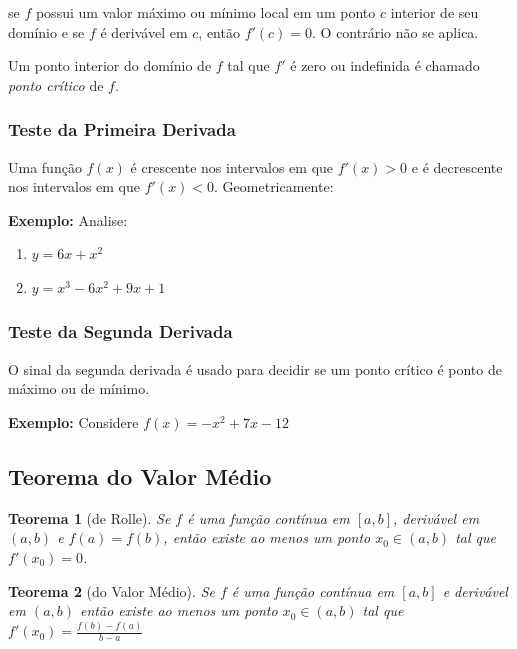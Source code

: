 \documentclass[oneside,a4paper,12pt]{article}
\newtheorem{theorem}{Teorema}[section]
\begin{document}
se $f$ possui um valor máximo ou mínimo local em um ponto $c$ interior de seu domínio e se $f$ é derivável em $c$, então $f'(c) = 0$. O contrário não se aplica.

Um ponto interior do domínio de $f$ tal que $f'$ é zero ou indefinida é chamado \emph{ponto crítico} de $f$.

\subsubsection{Teste da Primeira Derivada}

Uma função $f(x)$ é crescente nos intervalos em que $f'(x) > 0$ e é decrescente nos intervalos em que $f'(x) < 0$.
Geometricamente:

\vspace{200pt}

{\bf Exemplo: } Analise:
\begin{enumerate}
	\item $y = 6x + x^2$
	\vspace{250pt}
	\item $y = x^3 - 6x^2 + 9x + 1$
	\vspace{300pt}
\end{enumerate}
\newpage

\subsubsection{Teste da Segunda Derivada}

O sinal da segunda derivada é usado para decidir se um ponto crítico é ponto de máximo ou de mínimo.

\vspace{200pt}

{\bf Exemplo:} Considere $f(x) = -x^2 + 7x - 12$

\vspace{300pt}

\subsection{Teorema do Valor Médio}
\begin{theorem}[de Rolle]
	Se $f$ é uma função contínua em $[a,b]$, derivável em $(a,b)$ e $f(a) = f(b)$, então existe ao menos um ponto $x_0 \in (a,b)$ tal que $f'(x_0) = 0$.
\end{theorem}

\vspace{200pt}

\begin{theorem}[do Valor Médio]
	Se $f$ é uma função contínua em $[a,b]$ e derivável em $(a,b)$ então existe ao menos um ponto $x_0 \in (a,b)$ tal que $f'(x_0) = \frac{f(b) - f(a)}{b-a}$
\end{theorem}
\end{document}

